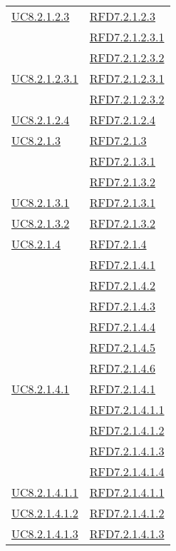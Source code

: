 \begin{longtable}{|>{\centering}m{5cm}|m{5cm}<{\centering}|}
\hyperref[UC8.2.1.2.3]{UC8.2.1.2.3} & \hyperlink{RFD7.2.1.2.3}{RFD7.2.1.2.3}\\
& \hyperlink{RFD7.2.1.2.3.1}{RFD7.2.1.2.3.1}\\
& \hyperlink{RFD7.2.1.2.3.2}{RFD7.2.1.2.3.2}\\ \hline
\hyperref[UC8.2.1.2.3.1]{UC8.2.1.2.3.1} & \hyperlink{RFD7.2.1.2.3.1}{RFD7.2.1.2.3.1}\\
& \hyperlink{RFD7.2.1.2.3.2}{RFD7.2.1.2.3.2}\\ \hline
\hyperref[UC8.2.1.2.4]{UC8.2.1.2.4} & \hyperlink{RFD7.2.1.2.4}{RFD7.2.1.2.4}\\ \hline
\hyperref[UC8.2.1.3]{UC8.2.1.3} & \hyperlink{RFD7.2.1.3}{RFD7.2.1.3}\\
& \hyperlink{RFD7.2.1.3.1}{RFD7.2.1.3.1}\\
& \hyperlink{RFD7.2.1.3.2}{RFD7.2.1.3.2}\\ \hline
\hyperref[UC8.2.1.3.1]{UC8.2.1.3.1} & \hyperlink{RFD7.2.1.3.1}{RFD7.2.1.3.1}\\ \hline
\hyperref[UC8.2.1.3.2]{UC8.2.1.3.2} & \hyperlink{RFD7.2.1.3.2}{RFD7.2.1.3.2}\\ \hline
\hyperref[UC8.2.1.4]{UC8.2.1.4} & \hyperlink{RFD7.2.1.4}{RFD7.2.1.4}\\
& \hyperlink{RFD7.2.1.4.1}{RFD7.2.1.4.1}\\
& \hyperlink{RFD7.2.1.4.2}{RFD7.2.1.4.2}\\
& \hyperlink{RFD7.2.1.4.3}{RFD7.2.1.4.3}\\
& \hyperlink{RFD7.2.1.4.4}{RFD7.2.1.4.4}\\
& \hyperlink{RFD7.2.1.4.5}{RFD7.2.1.4.5}\\
& \hyperlink{RFD7.2.1.4.6}{RFD7.2.1.4.6}\\ \hline
\hyperref[UC8.2.1.4.1]{UC8.2.1.4.1} & \hyperlink{RFD7.2.1.4.1}{RFD7.2.1.4.1}\\
& \hyperlink{RFD7.2.1.4.1.1}{RFD7.2.1.4.1.1}\\
& \hyperlink{RFD7.2.1.4.1.2}{RFD7.2.1.4.1.2}\\
& \hyperlink{RFD7.2.1.4.1.3}{RFD7.2.1.4.1.3}\\
& \hyperlink{RFD7.2.1.4.1.4}{RFD7.2.1.4.1.4}\\ \hline
\hyperref[UC8.2.1.4.1.1]{UC8.2.1.4.1.1} & \hyperlink{RFD7.2.1.4.1.1}{RFD7.2.1.4.1.1}\\ \hline
\hyperref[UC8.2.1.4.1.2]{UC8.2.1.4.1.2} & \hyperlink{RFD7.2.1.4.1.2}{RFD7.2.1.4.1.2}\\ \hline
\hyperref[UC8.2.1.4.1.3]{UC8.2.1.4.1.3} & \hyperlink{RFD7.2.1.4.1.3}{RFD7.2.1.4.1.3}\\ \hline

\end{longtable}
